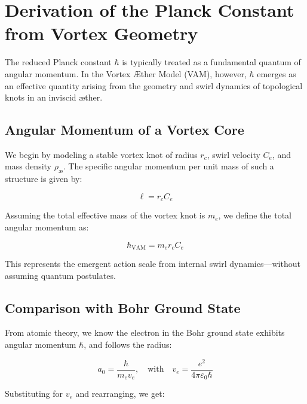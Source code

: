 
\section{Derivation of the Planck Constant from Vortex Geometry}
\label{appendix:hbar}

The reduced Planck constant \( \hbar \) is typically treated as a fundamental quantum of angular momentum. In the Vortex Æther Model (VAM), however, \( \hbar \) emerges as an effective quantity arising from the geometry and swirl dynamics of topological knots in an inviscid æther.

\subsection{Angular Momentum of a Vortex Core}

We begin by modeling a stable vortex knot of radius \( r_c \), swirl velocity \( C_e \), and mass density \( \rho_\text{\ae} \). The specific angular momentum per unit mass of such a structure is given by:

\begin{equation}
    \ell = r_c C_e
\end{equation}

Assuming the total effective mass of the vortex knot is \( m_e \), we define the total angular momentum as:

\begin{equation}
    \hbar_{\text{VAM}} = m_e r_c C_e
\end{equation}

This represents the emergent action scale from internal swirl dynamics—without assuming quantum postulates.

\subsection{Comparison with Bohr Ground State}

From atomic theory, we know the electron in the Bohr ground state exhibits angular momentum \( \hbar \), and follows the radius:

\begin{equation}
    a_0 = \frac{\hbar}{m_e v_e}, \quad \text{with} \quad v_e = \frac{e^2}{4\pi \varepsilon_0 \hbar}
\end{equation}

Substituting for \( v_e \) and rearranging, we get:

